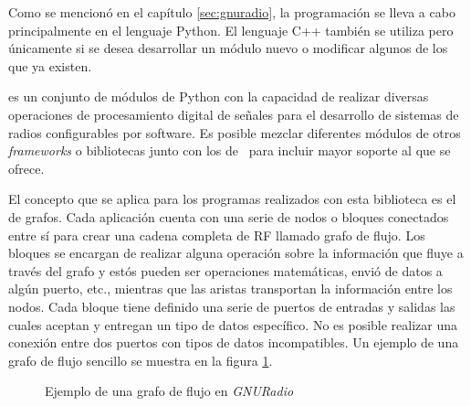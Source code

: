 Como se mencion\'o en el cap\'itulo \ref{sec:gnuradio}, la programaci\'on se lleva a
cabo principalmente en el lenguaje Python. El lenguaje C++ tambi\'en se utiliza
pero \'unicamente si se desea desarrollar un m\'odulo nuevo o modificar algunos de
los que ya existen.

\gnuradio es un conjunto de m\'odulos de Python con la capacidad de
realizar diversas operaciones de procesamiento digital de se\~nales para el desarrollo de
sistemas de radios configurables por software. Es posible mezclar diferentes
m\'odulos de otros \emph{frameworks} o bibliotecas junto con los de \gnuradio\
para incluir mayor soporte al que se ofrece.

El concepto que se aplica para los programas realizados con esta biblioteca es
el de grafos. Cada aplicaci\'on cuenta con una serie de nodos o bloques
conectados entre s\'i para crear una cadena completa de RF llamado grafo de
flujo. Los bloques se encargan de realizar alguna operaci\'on sobre la
informaci\'on que fluye a trav\'es del grafo y est\'os pueden ser operaciones
matem\'aticas, envi\'o de datos a alg\'un puerto, etc., mientras que las aristas
transportan la informaci\'on entre los nodos. Cada bloque tiene definido una
serie de puertos de entradas y salidas las cuales aceptan y entregan un tipo de
datos espec\'ifico. No es posible realizar una conexi\'on entre dos puertos con
tipos de datos incompatibles. Un ejemplo de una grafo de flujo sencillo se
muestra en la figura \ref{fig:radioflow}.

\begin{figure}[hpt]
  \centering
  \vspace{0.3in}
	\vspace{0.5in}
	\caption{Ejemplo de una grafo de flujo en \emph{GNURadio}}
	\label{fig:radioflow}
\end{figure}

